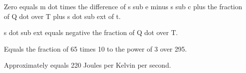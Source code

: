Zero equals m dot times the difference of s sub e minus s sub c plus the fraction of Q dot over T plus s dot sub ext of t.

s dot sub ext equals negative the fraction of Q dot over T.

Equals the fraction of 65 times 10 to the power of 3 over 295.

Approximately equals 220 Joules per Kelvin per second.